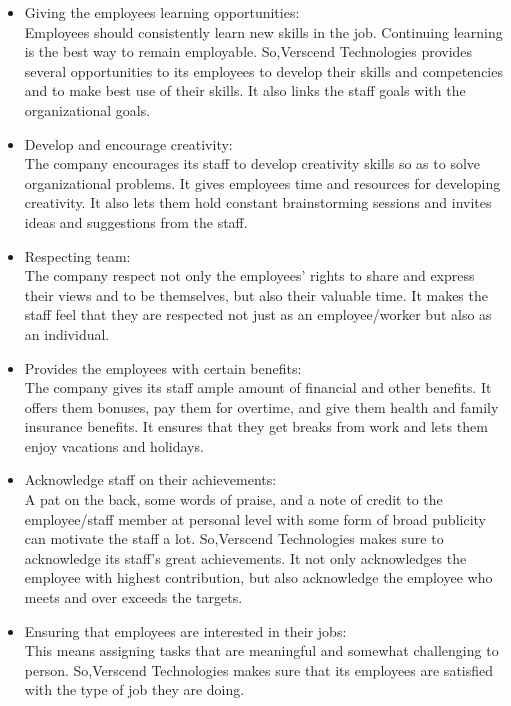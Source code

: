 \begin{itemize}
\item  Giving the employees learning opportunities:\\ Employees should consistently learn new skills in the
job. Continuing learning is the best way to remain employable. So,Verscend Technologies
provides several opportunities to its employees to develop their skills and competencies and to make
best use of their skills. It also links the staff goals with the organizational goals.
\item  Develop and encourage creativity: \\ The company encourages its staff to develop creativity skills so
as to solve organizational problems. It gives employees time and resources for developing creativity.
It also lets them hold constant brainstorming sessions and invites ideas and suggestions from the staff.
\item  Respecting team: \\ The company respect not only the employees’ rights to share and express their
views and to be themselves, but also their valuable time. It makes the staff feel that they are respected
not just as an employee/worker but also as an individual.
\item  Provides the employees with certain benefits: \\ The company gives its staff ample amount of financial
and other benefits. It offers them bonuses, pay them for overtime,
and give them health and family insurance benefits. It ensures that they get breaks from work and lets
them enjoy vacations and holidays.
\item  Acknowledge staff on their achievements: \\ A pat on the back, some words of praise, and a note of
credit to the employee/staff member at personal level with some form of broad publicity can motivate
the staff a lot. So,Verscend Technologies makes sure to acknowledge its staff's great
achievements. It not only acknowledges the employee with highest contribution, but also acknowledge
the employee who meets and over exceeds the targets.
\item  Ensuring that employees are interested in their jobs: \\ This means assigning tasks that are
meaningful and somewhat challenging to person. So,Verscend Technologies makes sure
that its employees are satisfied with the type of job they are doing.
\end{itemize}
\cleardoublepage


